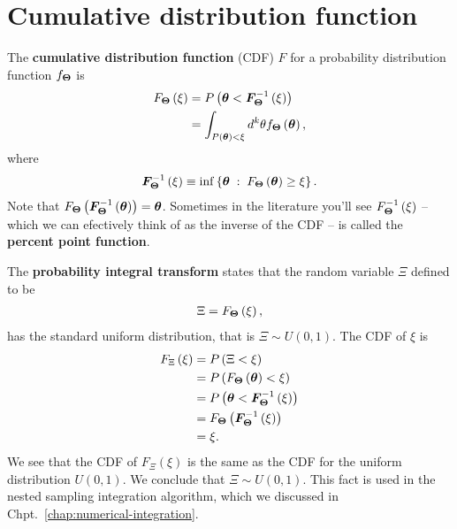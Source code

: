 \section{Cumulative distribution function}

The \textbf{cumulative distribution function} (CDF) $F$ for a probability distribution function $f_{{\bm \Theta}}$ is
\begin{align}
    F_{{\bm \Theta}}\left(\xi\right)
    &=
    P\left({\bm \theta} < {\bm F}^{-1}_{{\bm \Theta}}\left(\xi\right)\right)
    \nonumber\\
    &=
    \int_{P\left({\bm \theta}\right)<\xi} d^k\theta f_{{\bm \Theta}}\left({\bm \theta}\right)
    ,
\end{align}
where
\begin{align}
    {\bm F}^{-1}_{{\bm \Theta}}\left(\xi\right)
    \equiv
    \inf\left\{{\bm \theta} \; : \; F_{{\bm \Theta}}\left({\bm \theta}\right) \geq \xi\right\}
    .
\end{align}
Note that $F_{{\bm \Theta}}\left({\bm F}^{-1}_{{\bm \Theta}}\left({\bm \theta}\right)\right) = {\bm \theta}$.
Sometimes in the literature you'll see $F^{-1}_{{\bm \Theta}}\left(\xi\right)$ -- which we can efectively think of as the inverse of the CDF -- is called the \textbf{percent point function}.

The \textbf{probability integral transform} states that the random
variable $\Xi$ defined to be
\begin{align}
    \Xi = F_{{\bm \Theta}}\left(\xi\right)
    ,
\end{align}
has the standard uniform distribution, that is $\Xi\sim U\left(0,1\right)$.
The CDF of $\xi$ is
\begin{align}
    F_{\Xi}\left(\xi\right)
    &=
    P\left(\Xi < \xi\right)
    \nonumber\\
    &=
    P\left(F_{{\bm \Theta}}\left({\bm \theta}\right) < \xi\right)
    \nonumber\\
    &=
    P\left({\bm \theta} < {\bm F}^{-1}_{{\bm \Theta}}\left(\xi\right)\right)
    \nonumber\\
    &=
    F_{{\bm \Theta}}\left({\bm F}^{-1}_{{\bm \Theta}}\left(\xi\right)\right)
    \nonumber\\
    &=
    \xi
    .
\end{align}
We see that the CDF of $F_{\Xi}\left(\xi\right)$ is the same
as the CDF for the uniform distribution $U\left(0,1\right)$.
We conclude that $\Xi\sim U\left(0,1\right)$.
This fact is used in the nested sampling integration algorithm,
which we discussed in Chpt.~\ref{chap:numerical-integration}.

